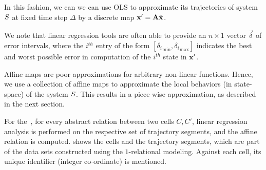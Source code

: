 In this fashion, we can we can use OLS to approximate its trajectories
of system $S$ at fixed time step $\Delta$ by a discrete map $\mathbf{x}'
= \mathbf{A}\hat{\mathbf{x}}$.

We note that linear regression tools are often able to provide an
$n\times 1$ vector $\vec{\delta}$ of error intervals, where the
$i^{th}$ entry of the form $[{\delta_i}_{\min},{\delta_i}_{\max}]$
indicates the best and worst possible error in computation of the
$i^{th}$ state in $\mathbf{x}'$.

Affine maps are poor approximations for arbitrary non-linear
functions. Hence, we use a collection of affine maps to approximate
the local behaviors (in state-space) of the system $S$. This
results in a piece wise approximation, as described in the next
section.

\begin{example}
    For the~, for every abstract relation between two cells
    $C, C'$, linear regression analysis is performed on the respective
    set of trajectory segments, and the affine relation is computed.
     shows the cells and the trajectory segments, which
    are part of the data sets constructed using the $1$-relational
    modeling. Against each cell, its unique identifier (integer
    co-ordinate) is mentioned.
\end{example}




